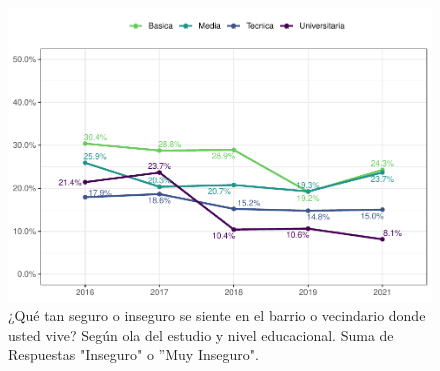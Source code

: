 \documentclass[
  12pt,
]{book}
\begin{document}
\begin{figure}

{\centering \includegraphics{reporte-elsoc_files/figure-latex/seguri-educ-1} 

}

\caption{¿Qué tan seguro o inseguro se siente en el barrio o vecindario donde usted vive? Según ola del estudio y nivel educacional. Suma de Respuestas "Inseguro" o ”Muy Inseguro".}\label{fig:seguri-educ}
\end{figure}
\end{document}
